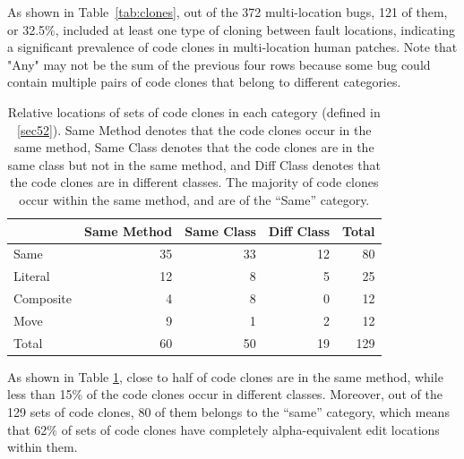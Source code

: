 \documentclass[10pt, conference]{IEEEtran}
\begin{document}
As shown in Table~\ref{tab:clones}, out of the 372 multi-location bugs,
121 of them, or  32.5\%, included at least one type of cloning between fault locations, indicating a 
significant 
prevalence of code clones in multi-location human patches.
Note that "Any" may not
be the sum of the previous four rows because some bug could contain multiple pairs of code clones 
that
belong to different categories.


\begin{table}
{\begin{center}
\begin{tabular} {lrrrr}
\toprule
& Same Method & Same Class & Diff Class & Total\\
\hline
Same & 35 & 33 & 12 & 80 \\ 
Literal & 12 & 8 & 5 & 25 \\
Composite & 4 & 8 & 0 & 12 \\
Move & 9 & 1 & 2 & 12 \\
\midrule
Total & 60 & 50 & 19  & 129\\
\bottomrule
\end{tabular}
\end{center}
}
\caption{
    Relative locations of sets of code clones in each category (defined in \ref{sec52}).
Same Method denotes that the code clones occur in the same method, Same Class denotes that the code
clones are in the same class but not in the same method, and Diff Class denotes that the
code clones are in different classes.
The majority of code clones occur within the same method, and are of
the ``Same'' category.}
\label{tab:clones_loc}
\end{table}

As shown in Table \ref{tab:clones_loc}, close to half of code clones are in the same method, while less than
15\% of the code clones occur in different classes. Moreover, out of the 129 sets of code clones,
80 of them belongs to the ``same'' category, which means that 62\% of sets of code clones have completely
alpha-equivalent edit locations within them.

\end{document}

